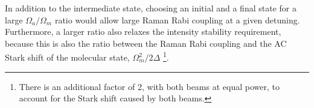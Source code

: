 \documentclass[aps,prl,twocolumn,superscriptaddress]{revtex4-1}
\begin{document}
In addition to the intermediate state, choosing an initial and a final state for a large $ \Omega_a/\Omega_m $ ratio would allow large Raman Rabi coupling at a given detuning. Furthermore, a larger ratio also relaxes the intensity stability requirement, because this is also the ratio between the Raman Rabi coupling and the AC Stark shift of the molecular state, $ \Omega_m^2 / 2\Delta $ \footnote{There is an additional factor of 2, with both beams at equal power, to account for the Stark shift caused by both beams.}.
\end{document}
